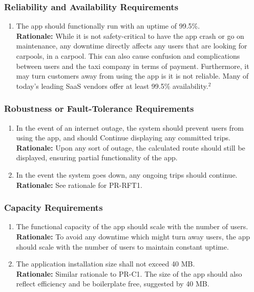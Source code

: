 \documentclass[]{article}
\begin{document}
\subsubsection{Reliability and Availability Requirements}
\label{ssub:reliability_and_availability_requirements}
\begin{enumerate}[{PR-RA}1. ]
	\item The app should functionally run with an uptime of 99.5\%.\\
	{\bf Rationale:} While it is not safety-critical to have the app crash or go on maintenance, any downtime directly affects any users that are looking for carpools, in a carpool. This can also cause confusion and complications between users and the taxi company in terms of payment. Furthermore, it may turn customers away from using the app is it is not reliable. Many of today's leading SaaS vendors offer at least 99.5\% availability.$^2$
\end{enumerate}

\subsubsection{Robustness or Fault-Tolerance Requirements}
\label{ssub:robustness_or_fault_tolerance_requirements}
\begin{enumerate}[{PR-RFT}1. ]
	\item In the event of an internet outage, the system should prevent users from using the app, and should Continue displaying any committed trips.\\
	{\bf Rationale:} Upon any sort of outage, the calculated route should still be displayed, ensuring partial functionality of the app.
	\item In the event the system goes down, any ongoing trips should continue.\\
	{\bf Rationale:} See rationale for PR-RFT1.
\end{enumerate}

\subsubsection{Capacity Requirements}
\label{ssub:capacity_requirements}
\begin{enumerate}[{PR-C}1. ]
	\item The functional capacity of the app should scale with the number of users.\\
	{\bf Rationale:} To avoid any downtime which might turn away users, the app should scale with the number of users to maintain constant uptime.
	\item The application installation size shall not exceed 40 MB.\\
	{\bf Rationale:} Similar rationale to PR-C1. The size of the app should also reflect efficiency and be boilerplate free, suggested by 40 MB.
\end{enumerate}
\end{document}

